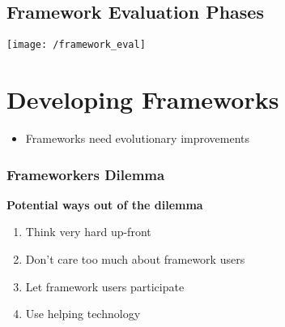 \subsection{Framework Evaluation Phases}
\texttt{[image: /framework\_eval]}

\section{Developing Frameworks}
\begin{itemize}[topsep=0pt]
    \itemsep -0.4em
    \item Frameworks need evolutionary improvements
\end{itemize}
\subsubsection{Frameworkers Dilemma}
\textbf{Potential ways out of the dilemma}
\begin{enumerate}[topsep=0pt]
    \itemsep -0.4em
    \item Think very hard up-front
    \item Don't care too much about framework users
    \item Let framework users participate
    \item Use helping technology
\end{enumerate}